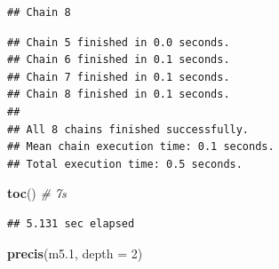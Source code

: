 \documentclass[
]{book}
\newenvironment{Shaded}{\begin{snugshade}}{\end{snugshade}}
\newcommand{\AttributeTok}[1]{\textcolor[rgb]{0.13,0.29,0.53}{#1}}
\newcommand{\CommentTok}[1]{\textcolor[rgb]{0.56,0.35,0.01}{\textit{#1}}}
\newcommand{\DecValTok}[1]{\textcolor[rgb]{0.00,0.00,0.81}{#1}}
\newcommand{\FloatTok}[1]{\textcolor[rgb]{0.00,0.00,0.81}{#1}}
\newcommand{\FunctionTok}[1]{\textcolor[rgb]{0.13,0.29,0.53}{\textbf{#1}}}
\newcommand{\NormalTok}[1]{#1}
\begin{document}
\begin{verbatim}
## Chain 8
\end{verbatim}

\begin{verbatim}
## Chain 5 finished in 0.0 seconds.
## Chain 6 finished in 0.1 seconds.
## Chain 7 finished in 0.1 seconds.
## Chain 8 finished in 0.1 seconds.
## 
## All 8 chains finished successfully.
## Mean chain execution time: 0.1 seconds.
## Total execution time: 0.5 seconds.
\end{verbatim}

\begin{Shaded}
\begin{Highlighting}[]
\FunctionTok{toc}\NormalTok{() }\CommentTok{\# 7s}
\end{Highlighting}
\end{Shaded}

\begin{verbatim}
## 5.131 sec elapsed
\end{verbatim}

\begin{Shaded}
\begin{Highlighting}[]
\FunctionTok{precis}\NormalTok{(m5}\FloatTok{.1}\NormalTok{, }\AttributeTok{depth =} \DecValTok{2}\NormalTok{)}
\end{Highlighting}
\end{Shaded}
\end{document}
